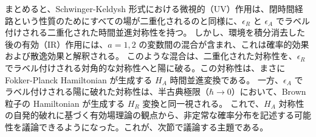 まとめると、Schwinger-Keldysh 形式における微視的（UV）作用は、閉時間経路という性質のためにすべての場が二重化されるのと同様に、$\epsilon_R$ と $\epsilon_A$ でラベル付けされる二重化された時間並進対称性を持つ。
しかし、環境を積分消去した後の有効（IR）作用には、$a=1,2$ の変数間の混合が含まれ、これは確率的効果および散逸効果と解釈される。
このような混合は、二重化された対称性を、$\epsilon_R$ でラベル付けされる対角的な対称性へと陽に破る。この対称性は、まさに Fokker-Planck Hamiltonian が生成する $H_A$ 時間並進変換である。
一方、$\epsilon_A$ でラベル付けされる陽に破れた対称性は、半古典極限（$\hbar \to 0$）において、Brown粒子の Hamiltonian が生成する $H_R$ 変換と同一視される。
これで、$H_A$ 対称性の自発的破れに基づく有効場理論の観点から、非定常な確率分布を記述する可能性を議論できるようになった。これが、次節で議論する主題である。




